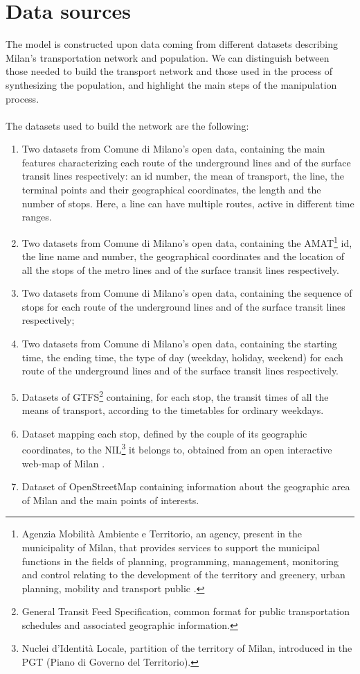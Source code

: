 
\section{Data sources}\label{sec:3.1}
The model is constructed upon data coming from different datasets describing Milan's transportation network and population. We can distinguish between those needed to build the transport network and those used in the process of synthesizing the population, and highlight the main steps of the manipulation process.\\ \\
The datasets used to build the network are the following:
\begin{enumerate} 
    \item Two datasets \cite{site1, site5} from Comune di Milano's open data, containing the main features characterizing each route of the underground lines and of the surface transit lines respectively: an id number, the mean of transport, the line, the terminal points and their geographical coordinates, the length and the number of stops. Here, a line can have multiple routes, active in different time ranges.  
    \item Two datasets \cite{site2, site6} from Comune di Milano's open data, containing the AMAT\footnote{Agenzia Mobilità Ambiente e Territorio, an agency, present in the municipality of Milan, that provides services to support the municipal functions in the fields of planning, programming, management, monitoring and control relating to the development of the territory and greenery, urban planning, mobility and transport public \cite{site21}.} id, the line name and number, the geographical coordinates and the location of all the stops of the metro lines and of the surface transit lines respectively.
    \item Two datasets \cite{site3, site7} from Comune di Milano's open data, containing the sequence of stops for each route of the underground lines and of the surface transit lines respectively;
    \item Two datasets \cite{site4, site8} from Comune di Milano's open data, containing the starting time, the ending time, the type of day (weekday, holiday, weekend) for each route of the underground lines and  of the surface transit lines respectively. 
    \item Datasets \cite{site12} of GTFS\footnote{General Transit Feed Specification, common format for public transportation schedules and associated geographic information.} containing, for each stop, the transit times of all the means of transport, according to the timetables for ordinary weekdays. 
    \item Dataset mapping each stop, defined by the couple of its geographic coordinates, to the NIL\footnote{Nuclei d'Identità Locale, partition of the territory of Milan, introduced in the PGT (Piano di Governo del Territorio).} it belongs to, obtained from an open interactive web-map of Milan \cite{site22}.
    \item Dataset of OpenStreetMap containing information about the geographic area of Milan and the main points of interests.
\end{enumerate} 
